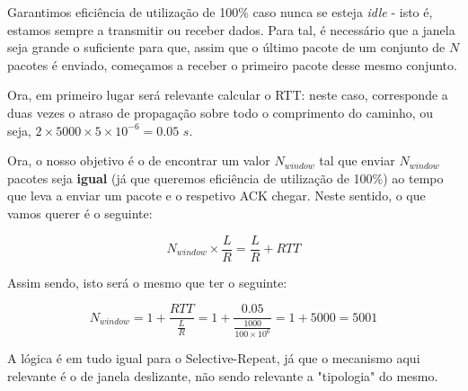 
Garantimos eficiência de utilização de 100\% caso nunca se esteja \textit{idle} - isto é,
estamos sempre a transmitir ou receber dados. Para tal, é necessário que a janela seja
grande o suficiente para que, assim que o último pacote de um conjunto de $N$ pacotes
é enviado, começamos a receber o primeiro pacote desse mesmo conjunto.

Ora, em primeiro lugar será relevante calcular o RTT: neste caso, corresponde a
duas vezes o atraso de propagação sobre todo o comprimento do caminho, ou seja,
$2 \times 5000 \times 5 \times 10^{-6} = 0.05$ $s$.

Ora, o nosso objetivo é o de encontrar um valor $N_{window}$ tal que enviar $N_{window}$
pacotes seja \textbf{igual} (já que queremos eficiência de utilização de 100\%) ao tempo
que leva a enviar um pacote e o respetivo ACK chegar. Neste sentido, o que vamos querer
é o seguinte:

$$
  N_{window} \times \frac{L}{R} = \frac{L}{R} + RTT
$$

Assim sendo, isto será o mesmo que ter o seguinte:

$$
  N_{window} = 1 + \frac{RTT}{\frac{L}{R}} = 1 + \frac{0.05}{\frac{1000}{100 \times 10^6}} = 1 + 5000 = 5001
$$

A lógica é em tudo igual para o Selective-Repeat, já que o mecanismo aqui relevante
é o de janela deslizante, não sendo relevante a "tipologia" do mesmo.
